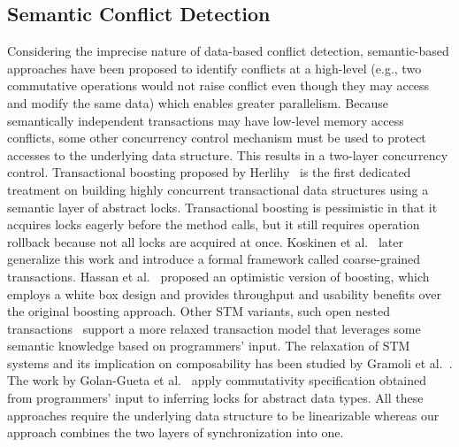 \documentclass[]{sig-alternate-05-2015}
\begin{document}
\subsection{Semantic Conflict Detection}
Considering the imprecise nature of data-based conflict detection, semantic-based approaches have been proposed to identify conflicts at a high-level (e.g., two commutative operations would not raise conflict even though they may access and modify the same data) which enables greater parallelism.
Because semantically independent transactions may have low-level memory access conflicts, some other concurrency control mechanism must be used to protect accesses to the underlying data structure.
This results in a two-layer concurrency control.
Transactional boosting proposed by Herlihy~\cite{herlihy2008transactional} is the first dedicated treatment on building highly concurrent transactional data structures using a semantic layer of abstract locks. 
Transactional boosting is pessimistic in that it acquires locks eagerly before the method calls, but it still requires operation rollback because not all locks are acquired at once.
Koskinen et al.~\cite{koskinen2010coarse} later generalize this work and introduce a formal framework called coarse-grained transactions.
Hassan et al.~\cite{hassan2014developing} proposed an optimistic version of boosting, which employs a white box design and provides throughput and usability benefits over the original boosting approach.
Other STM variants, such open nested transactions~\cite{ni2007open} support a more relaxed transaction model that leverages some semantic knowledge based on programmers' input.
The relaxation of STM systems and its implication on composability has been studied by Gramoli et al.~\cite{gramoli2013composing}.
The work by Golan-Gueta et al.~\cite{golan2015automatic} apply commutativity specification obtained from programmers' input to inferring locks for abstract data types.
All these approaches require the underlying data structure to be linearizable whereas our approach combines the two layers of synchronization into one.
\end{document}
